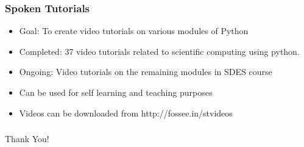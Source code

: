 \documentclass{beamer}
\begin{document}
\begin{frame}
	\frametitle{Spoken Tutorials}
	\begin{itemize}
	\item Goal: To create video tutorials on various modules of Python
	\item Completed: 37 video tutorials related to scientific computing using python.
	\item Ongoing: Video tutorials on the remaining modules in SDES course
	\item Can be used for self learning and teaching purposes
	\item Videos can be downloaded from http://fossee.in/stvideos	
	\end{itemize}
\end{frame}


\begin{frame}
\frametitle{}   
  \begin{center}
    \Huge{Thank You!}
  \end{center}
\end{frame}
\end{document}
